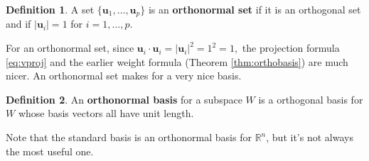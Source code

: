 \documentclass[
]{book}
\theoremstyle{definition}
\newtheorem{definition}{Definition}[chapter]
\theoremstyle{definition}
\theoremstyle{definition}
\theoremstyle{definition}
\theoremstyle{remark}
\begin{document}
\begin{defbox}

\begin{definition}
A set \(\{\mathbf{u}_1,\dots,\mathbf{u}_p\}\) is an \textbf{orthonormal set} if it is an orthogonal set and if \(|\mathbf{u}_i|=1\) for \(i=1,\dots,p\).
\end{definition}

\end{defbox}

For an orthonormal set, since \(\mathbf{u}_i\cdot\mathbf{u}_i=|\mathbf{u}_i|^2=1^2=1,\) the projection formula \eqref{eq:vproj} and the earlier weight formula (Theorem \ref{thm:orthobasis}) are much nicer. An orthonormal set makes for a very nice basis.

\begin{defbox}

\begin{definition}
An \textbf{orthonormal basis} for a subspace \(W\) is a orthogonal basis for \(W\) whose basis vectors all have unit length.
\end{definition}

\end{defbox}

Note that the standard basis is an orthonormal basis for \(\mathbb{R}^n\), but it's not always the most useful one.
\end{document}
